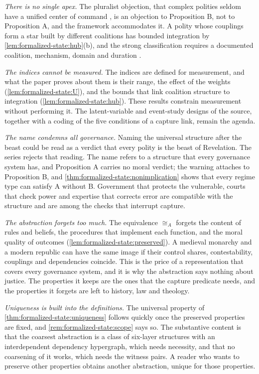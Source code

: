 \documentclass[11pt,letterpaper]{article}
\theoremstyle{definition}
\theoremstyle{remark}
\begin{document}
\emph{There is no single apex.} The pluralist objection, that complex polities seldom have a unified center of command \citep{dahl1961}, is an objection to Proposition B, not to Proposition A, and the framework accommodates it. A polity whose couplings form a star built by different coalitions has bounded integration by \cref{lem:formalized-state:hub}(b), and the strong classification requires a documented coalition, mechanism, domain and duration \citep{largo2026hbs}.

\emph{The indices cannot be measured.} The indices are defined for measurement, and what the paper proves about them is their range, the effect of the weights (\cref{lem:formalized-state:U}), and the bounds that link coalition structure to integration (\cref{lem:formalized-state:hub}). These results constrain measurement without performing it. The latent-variable and event-study designs of the source, together with a coding of the five conditions of a capture link, remain the agenda.

\emph{The name condemns all governance.} Naming the universal structure after the beast could be read as a verdict that every polity is the beast of Revelation. The series rejects that reading. The name refers to a structure that every governance system has, and Proposition A carries no moral verdict; the warning attaches to Proposition B, and \cref{thm:formalized-state:nonimplication} shows that every regime type can satisfy A without B. Government that protects the vulnerable, courts that check power and expertise that corrects error are compatible with the structure and are among the checks that interrupt capture.

\emph{The abstraction forgets too much.} The equivalence $\cong_A$ forgets the content of rules and beliefs, the procedures that implement each function, and the moral quality of outcomes (\cref{lem:formalized-state:preserved}). A medieval monarchy and a modern republic can have the same image if their control shares, contestability, couplings and dependencies coincide. This is the price of a representation that covers every governance system, and it is why the abstraction says nothing about justice. The properties it keeps are the ones that the capture predicate needs, and the properties it forgets are left to history, law and theology.

\emph{Uniqueness is built into the definitions.} The universal property of \cref{thm:formalized-state:uniqueness} follows quickly once the preserved properties are fixed, and \cref{rem:formalized-state:scope} says so. The substantive content is that the coarsest abstraction is a class of six-layer structures with an interdependent dependency hypergraph, which needs necessity, and that no coarsening of it works, which needs the witness pairs. A reader who wants to preserve other properties obtains another abstraction, unique for those properties.
\end{document}
